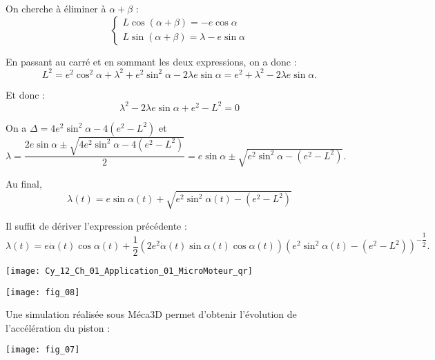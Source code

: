 \begin{corrige}
On cherche à éliminer à $\alpha+\beta$ :
$$
\left\{
\begin{array}{l}
L\cos\left(\alpha+\beta\right)  = - e\cos\alpha \\
L \sin\left(\alpha+\beta\right) =  \lambda - e\sin\alpha
\end{array}
\right.
$$

En passant au carré et en sommant les deux expressions, on a donc : 
$$
L^2=e^2\cos^2\alpha + \lambda^2 + e^2\sin^2\alpha-2\lambda e \sin\alpha
=e^2+ \lambda^2 -2\lambda e \sin\alpha.
$$

Et donc :
$$
 \lambda^2 -2\lambda e \sin\alpha+e^2-L^2=0
$$


On a $\Delta = 4e^2\sin^2\alpha - 4\left(e^2 - L^2 \right)$ et 
$\lambda 
= \dfrac{2 e \sin\alpha\pm \sqrt{4e^2\sin^2\alpha - 4\left(e^2 - L^2 \right)}}{2}
=  e \sin\alpha\pm \sqrt{e^2\sin^2\alpha - \left(e^2 - L^2 \right)}$.

Au final, 
$$\lambda(t)=  e \sin\alpha(t)+ \sqrt{e^2\sin^2\alpha(t) - \left(e^2 - L^2 \right)}$$



\end{corrige}
\else
\fi
{}
\ifprof
\begin{corrige}
Il suffit de dériver l'expression précédente :
$$\lambda(t)=  e \dot{\alpha}(t)\cos\alpha(t)+ \dfrac{1}{2}\left(2e^2\dot{\alpha}(t)\sin\alpha(t)\cos\alpha(t) \right)\left(e^2\sin^2\alpha(t) - \left(e^2 - L^2 \right)\right)^{-\dfrac{1}{2}}.$$
\end{corrige}
\else
\fi


\ifprof
\else
\begin{marginfigure}
\centering
\texttt{[image: Cy\_12\_Ch\_01\_Application\_01\_MicroMoteur\_qr]}
\end{marginfigure}
\fi

\ifprof
\begin{corrige}
\begin{center}
\texttt{[image: fig\_08]}
\end{center}
\end{corrige}
\else
\fi


Une simulation réalisée sous Méca3D permet d'obtenir l'évolution de l'accélération du piston : 

\begin{center}
\texttt{[image: fig\_07]}
\end{center}



